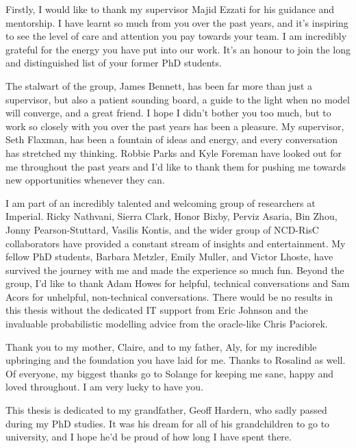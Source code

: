 
Firstly, I would like to thank my supervisor Majid Ezzati for his guidance and mentorship.
I have learnt so much from you over the past years, and it's inspiring to see the level of care and attention you pay towards your team.
I am incredibly grateful for the energy you have put into our work.
It's an honour to join the long and distinguished list of your former PhD students.

The stalwart of the group, James Bennett, has been far more than just a supervisor, but also a patient sounding board, a guide to the light when no model will converge, and a great friend.
I hope I didn't bother you too much, but to work so closely with you over the past years has been a pleasure.
My supervisor, Seth Flaxman, has been a fountain of ideas and energy, and every conversation has stretched my thinking.
Robbie Parks and Kyle Foreman have looked out for me throughout the past years and I'd like to thank them for pushing me towards new opportunities whenever they can.

I am part of an incredibly talented and welcoming group of researchers at Imperial.
Ricky Nathvani, Sierra Clark, Honor Bixby, Perviz Asaria, Bin Zhou, Jonny Pearson-Stuttard, Vasilis Kontis, and the wider group of NCD-RisC collaborators have provided a constant stream of insights and entertainment.
My fellow PhD students, Barbara Metzler, Emily Muller, and Victor Lhoste, have survived the journey with me and made the experience so much fun.
Beyond the group, I'd like to thank Adam Howes for helpful, technical conversations and Sam Acors for unhelpful, non-technical conversations.
There would be no results in this thesis without the dedicated IT support from Eric Johnson and the invaluable probabilistic modelling advice from the oracle-like Chris Paciorek.

Thank you to my mother, Claire, and to my father, Aly, for my incredible upbringing and the foundation you have laid for me.
Thanks to Rosalind as well.
Of everyone, my biggest thanks go to Solange for keeping me sane, happy and loved throughout.
I am very lucky to have you.

This thesis is dedicated to my grandfather, Geoff Hardern, who sadly passed during my PhD studies.
It was his dream for all of his grandchildren to go to university, and I hope he'd be proud of how long I have spent there.